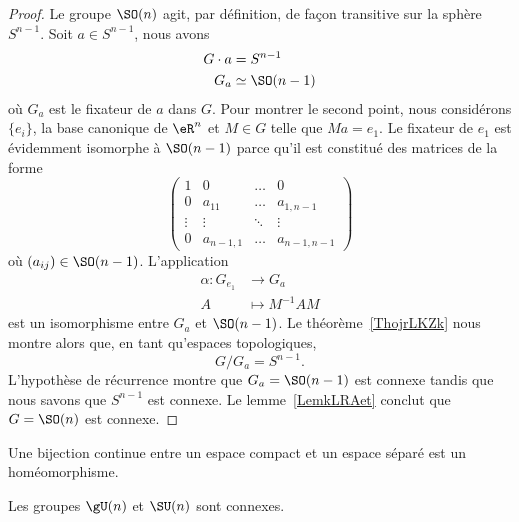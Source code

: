 \begin{proof}
	Le groupe \( \SO(n)\) agit, par définition, de façon transitive sur la sphère \( S^{n-1}\). Soit \( a\in S^{n-1}\), nous avons
	\begin{subequations}
		\begin{align}
			G\cdot a & =S^{n-1}        \\
			G_a      & \simeq \SO(n-1)
		\end{align}
	\end{subequations}
	où \( G_a\) est le fixateur de \( a\) dans \( G\). Pour montrer le second point, nous considérons \( \{ e_i \}\), la base canonique de \( \eR^n\) et \( M\in G\) telle que \( Ma=e_1\). Le fixateur de \( e_1\) est évidemment isomorphe à \( \SO(n-1)\) parce qu'il est constitué des matrices de la forme
	\begin{equation}
		\begin{pmatrix}
			1      & 0         & \ldots & 0           \\
			0      & a_{11}    & \ldots & a_{1,n-1}   \\
			\vdots & \vdots    & \ddots & \vdots      \\
			0      & a_{n-1,1} & \ldots & a_{n-1,n-1}
		\end{pmatrix}
	\end{equation}
	où \( (a_{ij})\in \SO(n-1)\). L'application
	\begin{equation}
		\begin{aligned}
			\alpha\colon G_{e_1} & \to G_{a}         \\
			A                    & \mapsto M^{-1}A M
		\end{aligned}
	\end{equation}
	est un isomorphisme entre \( G_a\) et \( \SO(n-1)\). Le théorème~\ref{ThojrLKZk} nous montre alors que, en tant qu'espaces topologiques,
	\begin{equation}
		G/G_a=S^{n-1}.
	\end{equation}
	L'hypothèse de récurrence montre que \( G_a=\SO(n-1)\) est connexe tandis que nous savons que \( S^{n-1}\) est connexe. Le lemme~\ref{LemkLRAet} conclut que \( G=\SO(n)\) est connexe.
\end{proof}

\begin{lemma}       \label{LemIbrsFT}
	Une bijection continue entre un espace compact et un espace séparé est un homéomorphisme.
\end{lemma}

\begin{proposition}     \label{PROPooTVHJooBRmUCd}
	Les groupes \( \gU(n)\) et \( \SU(n)\) sont connexes.
\end{proposition}

